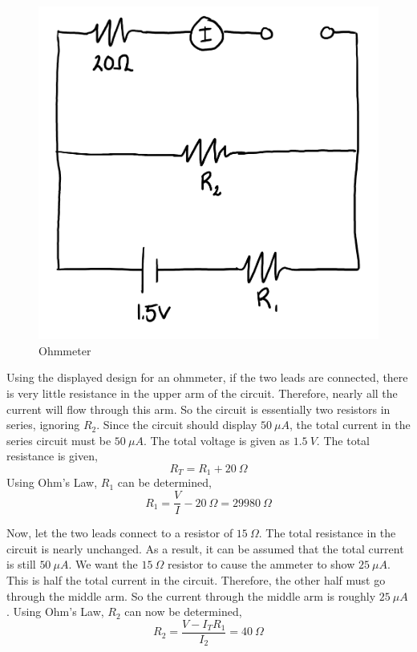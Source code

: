 \documentclass{article}
\begin{document}
\begin{figure}[H]
  \centering
  \includegraphics[scale=0.5]{"Ohmmeter"}
  \caption{Ohmmeter}
\end{figure}

Using the displayed design for an ohmmeter, if the two leads are connected,
there is very little resistance in the upper arm of the circuit. Therefore,
nearly all the current will flow through this arm. So the circuit is essentially
two resistors in series, ignoring $R_2$. Since the circuit should display $50\
\si{\mu A}$, the total current in the series circuit must be $50\ \si{\mu A}$.
The total voltage is given as $1.5\ \si{V}$. The total resistance is given,
$$ R_T = R_1 + 20\ \si{\Omega} $$
Using Ohm's Law, $R_1$ can be determined,
$$ R_1 = \frac{V}{I} - 20\ \si{\Omega} = 29980\ \si{\Omega} $$

Now, let the two leads connect to a resistor of $15\ \si{\Omega}$. The total
resistance in the circuit is nearly unchanged. As a result, it can be assumed
that the total current is still $50\ \si{\mu A}$. We want the $15\ \si{\Omega}$
resistor to cause the ammeter to show $25\ \si{\mu A}$. This is half the total
current in the circuit. Therefore, the other half must go through the middle
arm. So the current through the middle arm is roughly $25\ \si{\mu A}$. Using
Ohm's Law, $R_2$ can now be determined,
$$ R_2 = \frac{V - I_T R_1}{I_2} = 40\ \si{\Omega} $$
\end{document}
